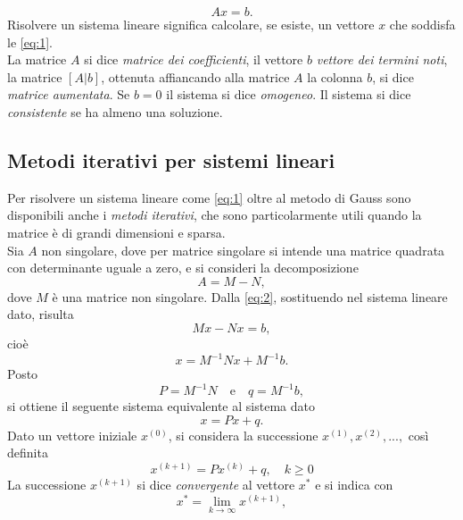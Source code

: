 \documentclass[12pt]{article}
\begin{document}
\begin{equation*}
    Ax = b.
\end{equation*}
Risolvere un sistema lineare significa calcolare, se esiste, un vettore \(x\) che soddisfa le \eqref{eq:1}.\\ La matrice \(A\) si dice \textit{matrice dei coefficienti}, il vettore \(b\) \textit{vettore dei termini noti}, la matrice \([A|b]\), ottenuta affiancando alla matrice \(A\) la colonna \(b\), si dice \textit{matrice aumentata}. Se \(b=0\) il sistema si dice \textit{omogeneo}. Il sistema si dice \textit{consistente} se ha almeno una soluzione.
\subsection{Metodi iterativi per sistemi lineari}
Per risolvere un sistema lineare come \eqref{eq:1} oltre al metodo di Gauss sono disponibili anche i \textit{metodi iterativi}, che sono particolarmente utili quando la matrice è di grandi dimensioni e sparsa.\\
Sia \(A\) non singolare, dove per matrice singolare si intende una matrice quadrata  con determinante uguale a zero, e si consideri la decomposizione
\begin{equation}
    \label{eq:2}
    A = M - N,
\end{equation}
dove \(M\) è una matrice non singolare. Dalla \eqref{eq:2}, sostituendo nel sistema lineare dato, risulta
\begin{equation*}
    Mx - Nx = b,
\end{equation*}
cioè
\begin{equation*}
    x = M^{-1}Nx + M^{-1}b.
\end{equation*}
Posto
\begin{equation}
    \label{eq:3}
    P = M^{-1}N \quad \text{e} \quad q = M^{-1}b,
\end{equation}
si ottiene il seguente sistema equivalente al sistema dato
\begin{equation}
    \label{eq:4}
    x = Px + q.
\end{equation}
Dato un vettore iniziale \(x^{(0)}\), si considera la successione \(x^{(1)},x^{(2)},...,\) così definita
\begin{equation}
    \label{eq:5}
    x^{(k+1)}=Px^{(k)}+q, \quad k\geq0
\end{equation}
La successione \(x^{(k+1)}\) si dice \textit{convergente} al vettore \(x^*\) e si indica con
\begin{equation*}
    x^*=\lim_{k\to\infty} x^{(k+1)}, 
\end{equation*}
\end{document}
